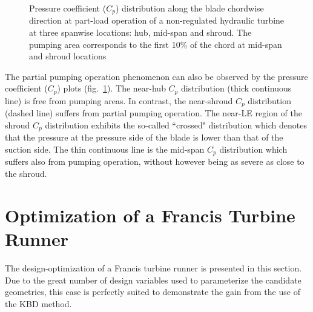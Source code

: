 \begin{figure}[h!]
\begin{minipage}[b]{1\linewidth}
 \centering
\end{minipage}
\caption{Pressure coefficient ($C_p$) distribution along the blade chordwise direction at part-load operation of a non-regulated hydraulic turbine at three spanwise locations: hub, mid-span and shroud. The pumping area corresponds to the first 10\% of the chord at mid-span and shroud locations}
\label{design-pumpS2}
\end{figure}

The partial pumping operation phenomenon can also be observed by the pressure coefficient ($C_p$) plots (fig.\ \ref{design-pumpS2}). The near-hub $C_p$ distribution (thick continuous line) is free from pumping areas. In contrast,  the near-shroud $C_p$ distribution (dashed line) suffers from partial pumping operation. The near-LE region of the shroud $C_p$ distribution exhibits the so-called ``crossed" distribution which denotes that the pressure at the pressure side of the blade is lower than that of the suction side. The thin continuous line is the mid-span $C_p$ distribution which suffers also from pumping operation, without however being as severe as close to the shroud.        
\FloatBarrier

\section{Optimization of a Francis Turbine Runner} %
The design-optimization of a Francis turbine runner is presented in this section. Due to the great number of design variables used to parameterize the candidate geometries, this case is perfectly suited to demonstrate the gain from the use  of the KBD method. 
\label{Francis-runners}
